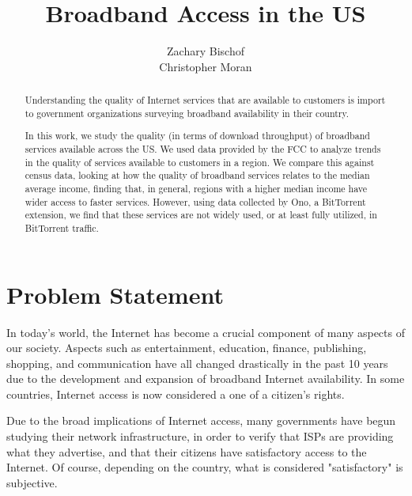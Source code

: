 \documentclass{sig-alternate-10pt}
\begin{document}
\title{Broadband Access in the US}
\author{
Zachary Bischof\\
Christopher Moran
}
  
\maketitle

\begin{abstract}
 
Understanding the quality of Internet services that are available to customers is
import to government organizations surveying broadband availability in their 
country.

In this work, we study the quality (in terms of download throughput) of
broadband services available across the US. We used data provided by the FCC to
analyze trends in the quality of services available to customers in a region.
We compare this against census data, looking at how the quality of broadband
services relates to the median average income, finding that, in general,
regions with a higher median income have wider access to faster services.
However, using data collected by Ono, a BitTorrent extension, we find that
these services are not widely used, or at least fully utilized, in BitTorrent
traffic.

\end{abstract}

\section{Problem Statement}
\label{sec:statement} 

In today's world, the Internet has become a crucial component of many aspects
of our society.  Aspects such as entertainment, education, finance, publishing,
shopping, and communication have all changed drastically in the past 10 years
due to the development and expansion of broadband Internet availability. In
some countries, Internet access is now considered a one of a citizen's rights.

Due to the broad implications of Internet access, many governments have begun
studying their network infrastructure, in order to verify that ISPs are
providing what they advertise, and that their citizens have satisfactory 
access to the Internet.  Of course, depending on the country, what is 
considered "satisfactory" is subjective.
\end{document}
